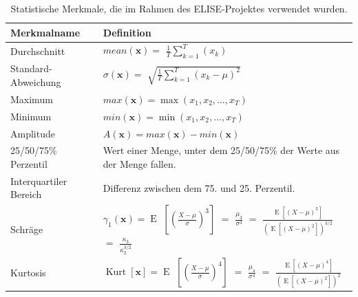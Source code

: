 \begin{table}[h]
\begin{tabular}{| l | p{12.5cm} |}
\hline
    \textbf{Merkmalname}     &  \textbf{Definition}  \\ \hline
    
    Durchschnitt         & \vspace{0.01cm}
    $ mean(\mathbf{x}) =$ \Large{$\frac{1}{T} \sum_{k=1}^T (x_k) $} \\[0.5cm] \hline 
    
    Standard-Abweichung        & \vspace{0.01cm}
    $ \sigma(\mathbf{x}) =$ \Large{$ \sqrt{ \frac{1}{T} \sum_{k=1}^{T}{(x_k - \mu)^{2}} } $ } \\[0.5cm] \hline
    
    Maximum                   & \vspace{0.01cm}
    $ max(\mathbf{x}) = \max(x_{1},x_{2},\dots ,x_{T}) $
    \\[0.5cm] \hline
    
    Minimum                   & \vspace{0.01cm}
    $ min(\mathbf{x}) = \min(x_{1},x_{2},\dots ,x_{T}) $
    \\[0.5cm] \hline
    
    Amplitude                 & \vspace{0.01cm}
    $ A(\mathbf{x}) = max(\mathbf{x}) - min(\mathbf{x}) $ 
    \\[0.5cm] \hline
    
    25/50/75\% Perzentil      & Wert einer Menge, unter dem 25/50/75\% der Werte aus der Menge fallen. \\ \hline
    
    Interquartiler Bereich    & Differenz zwischen dem 75. und 25. Perzentil.
    \\ \hline
     
    Schräge                   & \vspace{0.01cm}
    $ \gamma _{1}(\mathbf{x}) = \operatorname{E}$ \Large{$\left[\left({\frac {X-\mu }{\sigma }}\right)^{3}\right]$ \normalsize{$=$} ${\frac {\mu _{3}}{\sigma ^{3}}}$ \normalsize{$=$} ${\frac {\operatorname {E} \left[(X-\mu )^{3}\right]}{ (\operatorname {E} \left[(X-\mu )^{2}\right])^{3/2}}}$ \normalsize{$=$} ${\frac {\kappa _{3}}{\kappa _{2}^{3/2}}} $} \vspace{0.2cm}
    \\[0.3cm] \hline
     
    Kurtosis                  & \vspace{0.01cm}
    $ \operatorname {Kurt}[\mathbf{x}] = \operatorname{E} $ \Large{$\left[\left({\frac {X-\mu }{\sigma }}\right)^{4}\right]$ \normalsize{$=$} ${\frac {\mu _{4}}{\sigma ^{4}}}$ \normalsize{$=$} ${\frac {\operatorname {E} [(X-\mu )^{4}]}{(\operatorname {E} [(X-\mu )^{2}])^{2}}} $} \vspace{0.2cm}
    \\[0.3cm] \hline
\end{tabular} 
\caption{Statistische Merkmale, die im Rahmen des ELISE-Projektes verwendet wurden. } \label{tab:statistische}
\end{table} 


